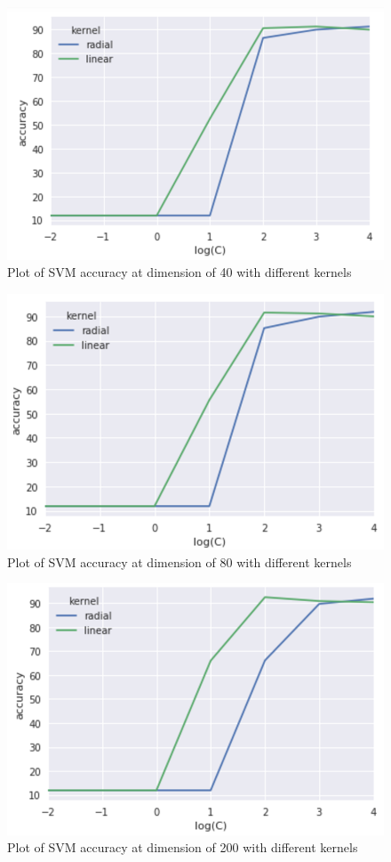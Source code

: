 \documentclass[11pt, oneside]{article}
\begin{document}
\begin{figure}
\centering
\includegraphics{./pics/d40.PNG}
\caption{Plot of SVM accuracy at dimension of 40 with different kernels}
\end{figure}

\begin{figure}
\centering
\includegraphics{./pics/d80.PNG}
\caption{Plot of SVM accuracy at dimension of 80 with different kernels}
\end{figure}

\begin{figure}
\centering
\includegraphics{./pics/d200.PNG}
\caption{Plot of SVM accuracy at dimension of 200 with different kernels}
\end{figure}
\end{document}
